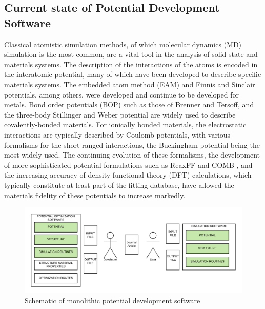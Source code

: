 \subsection{Current state of Potential Development Software}

Classical atomistic simulation methods, of which molecular dynamics (MD) simulation\cite{allen1987_md,haile1992_md,lesar2013_md,frenkel2002_md} is the most common, are a vital tool in the analysis of solid state and materials systems.
The description of the interactions of the atoms is encoded in the interatomic potential, many of which have been developed to describe specific materials systems.
The embedded atom method (EAM)\cite{daw1983_eam,daw1984_eam,daw1993_eam_review,foiles2012_eam_review} and Finnis and Sinclair\cite{finnis1984_fs} potentials, among others, were developed and continue to be developed for metals.
Bond order potentials (BOP) such as those of Brenner\cite{brenner1989_bop,brenner2002_rebo} and Tersoff\cite{tersoff1988_tersoff}, and the three-body Stillinger and Weber\cite{stillinger1985_sw} potential are widely used to describe covalently-bonded materials.
For ionically bonded materials, the electrostatic interactions are typically described by Coulomb potentials, with various formalisms for the short ranged interactions, the Buckingham potential being the most widely used.\cite{lewis1985_buck,gale1996_buck}
The continuing evolution of these formalisms, the development of more sophisticated potential formulations such as ReaxFF\cite{vanduin2001_reaxff,senftle2016_reaxff} and COMB \cite{liang2013_comb_1,liang2013_comb_2}, and the increasing accuracy of density functional theory (DFT) calculations, which typically constitute at least part of the fitting database, have allowed the materials fidelity of these potentials to increase markedly.

\begin{figure}[ht]
	\centering
	\includegraphics[width=5in]{chapter6/img/fig_potdev_monolithic}
	\caption{Schematic of monolithic potential development software}
	\label{fig:potdev_monolithic}
\end{figure}

